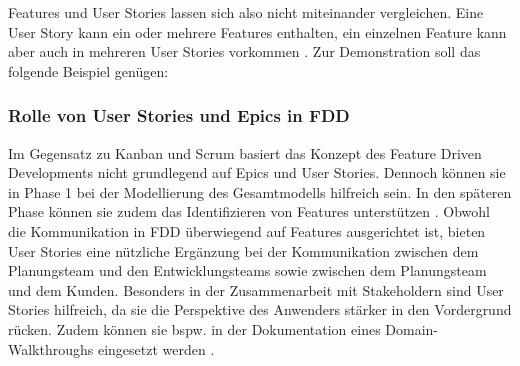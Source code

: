 \documentclass[acmtog]{acmart}
\begin{document}
Features und User Stories lassen sich also nicht miteinander vergleichen. Eine User Story kann ein oder mehrere Features enthalten, ein einzelnen Feature kann aber auch in mehreren User Stories vorkommen \cite{hunt06}. Zur Demonstration soll das folgende Beispiel genügen:\smallskip


\subsubsection{Rolle von User Stories und Epics in FDD}

Im Gegensatz zu Kanban und Scrum basiert das Konzept des Feature Driven Developments nicht grundlegend auf Epics und User Stories.
Dennoch können sie in Phase 1 bei der Modellierung des Gesamtmodells hilfreich sein.
In den späteren Phase können sie zudem das Identifizieren von Features unterstützen \cite{hunt06}.
Obwohl die Kommunikation in FDD überwiegend auf Features ausgerichtet ist, bieten User Stories eine nützliche Ergänzung bei der Kommunikation zwischen dem Planungsteam und den Entwicklungsteams sowie zwischen dem Planungsteam und dem Kunden.
Besonders in der Zusammenarbeit mit Stakeholdern sind User Stories hilfreich, da sie die Perspektive des Anwenders stärker in den Vordergrund rücken.
Zudem können sie bspw. in der Dokumentation eines Domain-Walkthroughs eingesetzt werden \cite{palmer02}.
\end{document}
